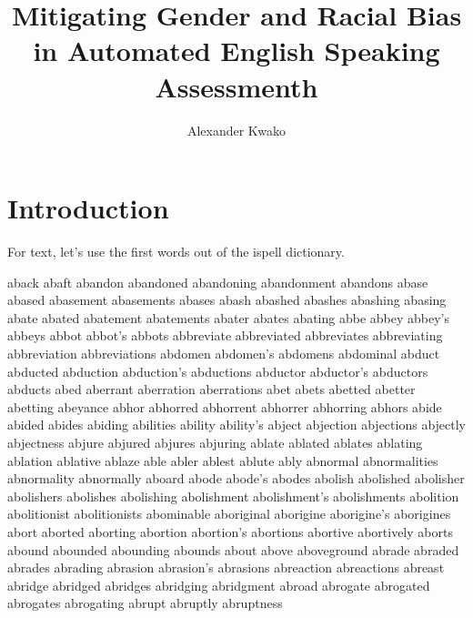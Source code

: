 \documentclass [PhD] {uclathes}
\title          {Mitigating Gender and Racial Bias \\
                in Automated English Speaking Assessmenth}
\author         {Alexander Kwako}
\begin{document}
\makeintropages

%
%

\chapter{Introduction}

For text, let's use the first words out of the ispell dictionary.

aback
abaft
abandon
abandoned
abandoning
abandonment
abandons
abase
abased
abasement
abasements
abases
abash
abashed
abashes
abashing
abasing
abate
abated
abatement
abatements
abater
abates
abating
abbe
abbey
abbey's
abbeys
abbot
abbot's
abbots
abbreviate
abbreviated
abbreviates
abbreviating
abbreviation
abbreviations
abdomen
abdomen's
abdomens
abdominal
abduct
abducted
abduction
abduction's
abductions
abductor
abductor's
abductors
abducts
abed
aberrant
aberration
aberrations
abet
abets
abetted
abetter
abetting
abeyance
abhor
abhorred
abhorrent
abhorrer
abhorring
abhors
abide
abided
abides
abiding
abilities
ability
ability's
abject
abjection
abjections
abjectly
abjectness
abjure
abjured
abjures
abjuring
ablate
ablated
ablates
ablating
ablation
ablative
ablaze
able
abler
ablest
ablute
ably
abnormal
abnormalities
abnormality
abnormally
aboard
abode
abode's
abodes
abolish
abolished
abolisher
abolishers
abolishes
abolishing
abolishment
abolishment's
abolishments
abolition
abolitionist
abolitionists
abominable
aboriginal
aborigine
aborigine's
aborigines
abort
aborted
aborting
abortion
abortion's
abortions
abortive
abortively
aborts
abound
abounded
abounding
abounds
about
above
aboveground
abrade
abraded
abrades
abrading
abrasion
abrasion's
abrasions
abreaction
abreactions
abreast
abridge
abridged
abridges
abridging
abridgment
abroad
abrogate
abrogated
abrogates
abrogating
abrupt
abruptly
abruptness

\end{document}
